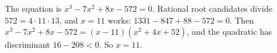 The equation is $x^3-7x^2+8x-572=0$. Rational root candidates divide $572=4\cdot11\cdot13$, and $x=11$ works: $1331-847+88-572=0$. Then $x^3-7x^2+8x-572=(x-11)(x^2+4x+52)$, and the quadratic has discriminant $16-208<0$. So $\boxed{x=11}$.
